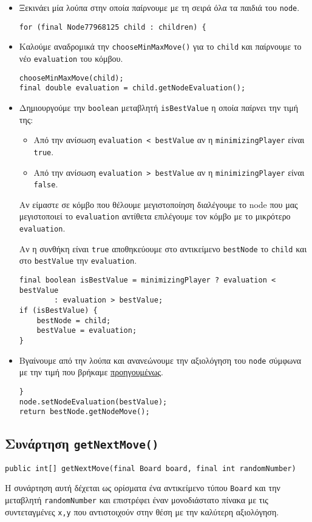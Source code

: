 \begin{itemize}
\item Ξεκινάει μία λούπα στην οποία
παίρνουμε με τη σειρά όλα τα παιδιά του \lstinline!node!.
\begin{lstlisting}[style=chunk]
for (final Node77968125 child : children) {
\end{lstlisting}

\item Καλούμε αναδρομικά την
\lstinline!chooseMinMaxMove()! για το \lstinline!child!
και παίρνουμε το νέο \lstinline!evaluation! του κόμβου.
\begin{lstlisting}[style=chunk]
chooseMinMaxMove(child);
final double evaluation = child.getNodeEvaluation();
\end{lstlisting}

\item Δημιουργούμε την \lstinline!boolean! μεταβλητή \lstinline!isBestValue! η οποία
παίρνει την τιμή της:
\begin{itemize}
\item Από την ανίσωση \lstinline!evaluation < bestValue! αν η \lstinline!minimizingPlayer! είναι \lstinline!true!.
\item Από την ανίσωση \lstinline!evaluation > bestValue! αν η \lstinline!minimizingPlayer! είναι \lstinline!false!.
\end{itemize}
Αν είμαστε σε κόμβο που θέλουμε
μεγιστοποίηση διαλέγουμε το node που μας μεγιστοποιεί το \lstinline!evaluation!
αντίθετα επιλέγουμε τον κόμβο με το μικρότερο \lstinline!evaluation!.

\label{item:bestValue}
Αν η συνθήκη είναι \lstinline!true! αποθηκεύουμε στο αντικείμενο \lstinline!bestNode! το \lstinline!child! και στο \lstinline!bestValue! την \lstinline!evaluation!.
\begin{lstlisting}[style=chunk]
final boolean isBestValue = minimizingPlayer ? evaluation < bestValue
        : evaluation > bestValue;
if (isBestValue) {
    bestNode = child;
    bestValue = evaluation;
}
\end{lstlisting}

\item Βγαίνουμε από την λούπα και ανανεώνουμε την αξιολόγηση του \lstinline!node! σύμφωνα με την τιμή που βρήκαμε
\hyperref[item:bestValue]{προηγουμένως}.
\begin{lstlisting}[style=chunk]
}
node.setNodeEvaluation(bestValue);
return bestNode.getNodeMove();
\end{lstlisting}
\end{itemize}

\subsection{Συνάρτηση \texttt{getNextMove()}}
\begin{lstlisting}[style=declaration]
public int[] getNextMove(final Board board, final int randomNumber)
\end{lstlisting}
Η συνάρτηση αυτή δέχεται ως ορίσματα ένα αντικείμενο τύπου \lstinline!Board! και
την μεταβλητή \lstinline!randomNumber! και επιστρέφει έναν
μονοδιάστατο πίνακα με τις συντεταγμένες \lstinline!x,y!
που αντιστοιχούν στην θέση με την καλύτερη αξιολόγηση.

